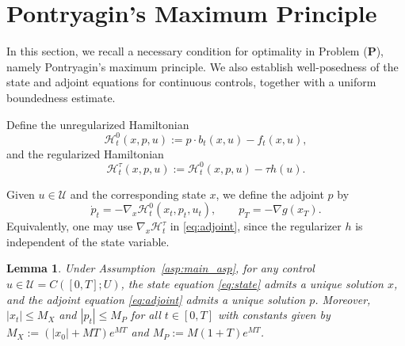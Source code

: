 \documentclass[11pt]{amsart}
\theoremstyle{plain}
\newtheorem{lemma}{Lemma}
\theoremstyle{definition}
\theoremstyle{remark}
\begin{document}
\section{Pontryagin's Maximum Principle} \label{sec:max_prin}

In this section, we recall a necessary condition for optimality in Problem (\textbf{P}), namely Pontryagin's maximum principle. We also establish well-posedness of the state and adjoint equations for continuous controls, together with a uniform boundedness estimate.

Define the unregularized Hamiltonian
\begin{equation}\label{eq:H0}
\mathcal H_t^0(x,p,u):= p\cdot b_t(x,u)- f_t(x,u),
\end{equation}
and the regularized Hamiltonian
\begin{equation}\label{eq:Htau}
\mathcal H_t^\tau(x,p,u):= \mathcal H_t^0(x,p,u) - \tau h(u).
\end{equation}

Given $u\in\mathcal U$ and the corresponding state $x$, we define the adjoint $p$ by
\begin{equation}\label{eq:adjoint}
\dot p_t = - \nabla_x \mathcal H_t^0(x_t,p_t,u_t),
\qquad
p_T = - \nabla g(x_T).
\end{equation}
Equivalently, one may use $\nabla_x\mathcal H_t^\tau$ in \eqref{eq:adjoint}, since the regularizer $h$ is independent of the state variable.

\begin{lemma}\label{lmm:a_priori}
    Under Assumption~\ref{asp:main_asp}, for any control $u \in \mathcal{U} = C([0, T]; U)$, the state equation \eqref{eq:state} admits a unique solution $x$, and the adjoint equation \eqref{eq:adjoint} admits a unique solution $p$. Moreover, $|x_t| \leq M_X$ and $|p_t| \leq M_P$ for all $t \in [0,T]$ with constants given by $M_X := (|x_0|+MT)e^{MT}$ and $M_P := M(1+T)e^{MT}$.
\end{lemma}
\end{document}
